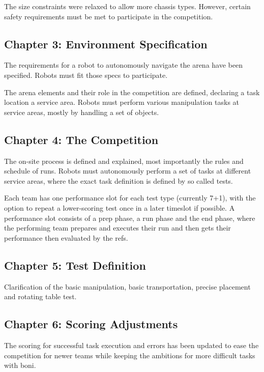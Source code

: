 The size constraints were relaxed to allow more chassis types.
However, certain safety requirements must be met to participate in the competition.

\subsection{Chapter 3: Environment Specification}

The requirements for a robot to autonomously navigate the arena have been specified. Robots must fit those specs to participate.

The arena elements and their role in the competition are defined, declaring a task location a service area.
Robots must perform various manipulation tasks at service areas, mostly by handling a set of objects.



\subsection{Chapter 4: The Competition}

The on-site process is defined and explained, most importantly the rules and schedule of runs. Robots must autonomously perform a set of tasks at different service areas, where the exact task definition is defined by so called tests.

Each team has one performance slot for each test type (currently 7+1), with the option to repeat a lower-scoring test once in a later timeslot if possible.
A performance slot consists of a prep phase, a run phase and the end phase, where the performing team prepares and executes their run and then gets their performance then evaluated by the refs.

\subsection{Chapter 5: Test Definition}

Clarification of the basic manipulation, basic transportation, precise placement and rotating table test.


\subsection{Chapter 6: Scoring Adjustments}

The scoring for successful task execution and errors has been updated to ease the competition for newer teams while keeping the ambitions for more difficult tasks with boni.

